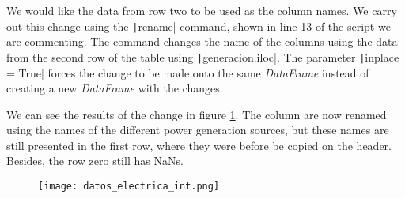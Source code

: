 \begin{paracol}{2}
We would like the data from row two to be used as the column names. We carry out this change using the \texttt|rename| command, shown in line 13 of the script we are commenting. The command changes the name of the columns using the data from the second row of the table using \texttt|generacion.iloc|. The parameter \texttt|inplace = True| forces the change to be made onto the same \emph{DataFrame} instead of creating a new \emph{DataFrame} with the changes.

We can see the results of the change in figure \ref{fig:datafint}. The column are now renamed using the names of the different power generation sources, but these names are still presented  in the first row, where they were before be copied on the header. Besides, the row zero still has NaNs. 
\end{paracol}
\begin{figure}
	\centering
	\texttt{[image: datos\_electrica\_int.png]}
	\label{fig:datafint}
\end{figure}

